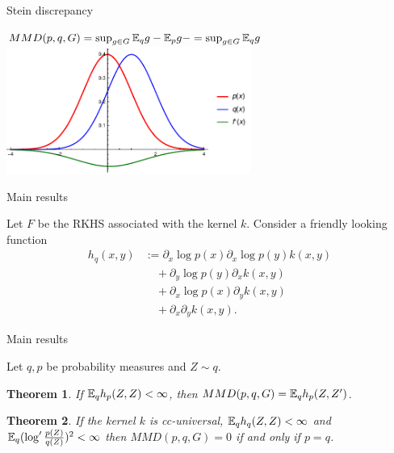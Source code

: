 \documentclass{beamer}
\newtheorem{thm}{Theorem}
\begin{document}
 
 \begin{frame}{Stein discrepancy}
 \begin{center}
 
$MMD(p,q,G) = \sup_{g\in G} \mathbb{E}_{q}g - \mathbb{E}_{p} g - = \sup_{g \in G} \mathbb{E}_{q} g $  \\
\vspace{0.5cm}
 \includegraphics[width=0.6\textwidth]{./img/s01.pdf} 
 \end{center}
 \end{frame} 

 
\begin{frame}{Main results}
\begin{center}
 Let $F$ be the RKHS associated with the kernel $k$. Consider a friendly looking function
\begin{align*}
h_{q}(x,y) & := \partial_{x} \log p(x) \partial_{x} \log p(y) k(x,y)\\
 & \quad+\partial_{y} \log p(y) \partial_{x}  k(x,y)\\
 & \quad+\partial_{x} \log p(x) \partial_{y}k(x,y)\\
 & \quad+\partial_{x} \partial_{y} k(x,y).
\end{align*}
\end{center}
\end{frame}
 
\begin{frame}{Main results}

Let $q,p$ be probability measures and $Z\sim q$. 
\begin{thm}
If $\mathbb{E}_{q} h_p(Z,Z)<\infty$, then $MMD(p,q,G) = \mathbb{E}_{q} h_{p}(Z,Z')$.
\end{thm}
\begin{thm}
 If the kernel $k$ is cc-universal, $\mathbb{E}_{q} h_{q}(Z,Z)<\infty$ and $\mathbb{E}_{q} (\log' \frac{p(Z)}{q(Z)})^{2}<\infty$
then $MMD(p,q,G) =0$ if and only if $p=q$.
\end{thm}

\end{frame} 
\end{document}
